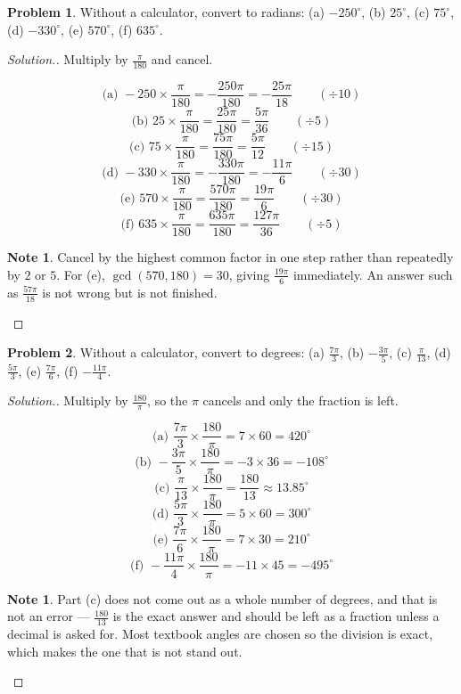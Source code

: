 \documentclass[11pt,a4paper]{article}
\theoremstyle{definition}
\newtheorem{note}[thm]{Note}
\newtheorem{problemx}{Problem}[section]
\newenvironment{problem}{\begin{problemx}}{\end{problemx}}
\newenvironment{solution}
  {\renewcommand{\qedsymbol}{}\begin{proof}[\textit{Solution}.]}
  {\end{proof}}
\begin{document}
\begin{problem}
Without a calculator, convert to radians:
\quad (a) $-250^\circ$, \quad (b) $25^\circ$, \quad (c) $75^\circ$, \quad
(d) $-330^\circ$, \quad (e) $570^\circ$, \quad (f) $635^\circ$.
\end{problem}

\begin{solution}
Multiply by $\frac{\pi}{180}$ and cancel.

$$\text{(a) } -250\times\frac{\pi}{180}=-\frac{250\pi}{180}=-\frac{25\pi}{18}
\qquad (\div 10)$$
$$\text{(b) } 25\times\frac{\pi}{180}=\frac{25\pi}{180}=\frac{5\pi}{36}\qquad (\div 5)$$
$$\text{(c) } 75\times\frac{\pi}{180}=\frac{75\pi}{180}=\frac{5\pi}{12}\qquad (\div 15)$$
$$\text{(d) } -330\times\frac{\pi}{180}=-\frac{330\pi}{180}=-\frac{11\pi}{6}
\qquad (\div 30)$$
$$\text{(e) } 570\times\frac{\pi}{180}=\frac{570\pi}{180}=\frac{19\pi}{6}
\qquad (\div 30)$$
$$\text{(f) } 635\times\frac{\pi}{180}=\frac{635\pi}{180}=\frac{127\pi}{36}
\qquad (\div 5)$$

\begin{note}
Cancel by the highest common factor in one step rather than repeatedly by $2$ or $5$.
For (e), $\gcd(570,180)=30$, giving $\frac{19\pi}{6}$ immediately. An answer such as
$\frac{57\pi}{18}$ is not wrong but is not finished.
\end{note}
\end{solution}

\begin{problem}
Without a calculator, convert to degrees:
\quad (a) $\frac{7\pi}{3}$, \quad (b) $-\frac{3\pi}{5}$, \quad (c) $\frac{\pi}{13}$,
\quad (d) $\frac{5\pi}{3}$, \quad (e) $\frac{7\pi}{6}$, \quad (f) $-\frac{11\pi}{4}$.
\end{problem}

\begin{solution}
Multiply by $\frac{180}{\pi}$, so the $\pi$ cancels and only the fraction is left.

$$\text{(a) } \frac{7\pi}{3}\times\frac{180}{\pi}=7\times 60=420^\circ$$
$$\text{(b) } -\frac{3\pi}{5}\times\frac{180}{\pi}=-3\times 36=-108^\circ$$
$$\text{(c) } \frac{\pi}{13}\times\frac{180}{\pi}=\frac{180}{13}
\approx 13.85^\circ$$
$$\text{(d) } \frac{5\pi}{3}\times\frac{180}{\pi}=5\times 60=300^\circ$$
$$\text{(e) } \frac{7\pi}{6}\times\frac{180}{\pi}=7\times 30=210^\circ$$
$$\text{(f) } -\frac{11\pi}{4}\times\frac{180}{\pi}=-11\times 45=-495^\circ$$

\begin{note}
Part (c) does not come out as a whole number of degrees, and that is not an error ---
$\frac{180}{13}$ is the exact answer and should be left as a fraction unless a decimal
is asked for. Most textbook angles are chosen so the division is exact, which makes the
one that is not stand out.
\end{note}
\end{solution}
\end{document}
